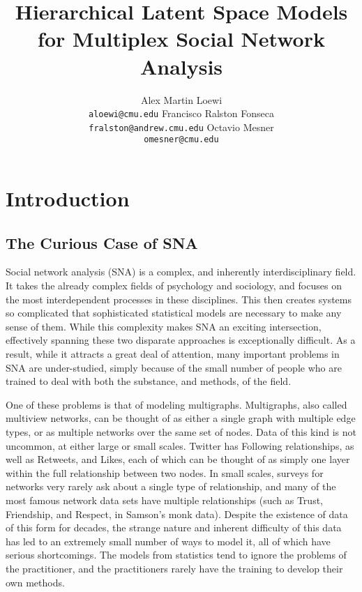 \documentclass{article}
\title{Hierarchical Latent Space Models\\for Multiplex Social Network Analysis}
\author{
  Alex Martin Loewi \\
  \texttt{aloewi@cmu.edu}
  \And
  Francisco Ralston Fonseca\\
  \texttt{fralston@andrew.cmu.edu}
  \And
  Octavio Mesner\\
  \texttt{omesner@cmu.edu}
}
\begin{document}

\maketitle

\begin{abstract}

\end{abstract}

\section{Introduction}


\subsection{The Curious Case of SNA}
Social network analysis (SNA) is a complex, and inherently interdisciplinary field. It takes the already complex fields of psychology and sociology, and focuses on the most interdependent processes in these disciplines. This then creates systems so complicated that sophisticated statistical models are necessary to make any sense of them. While this complexity makes SNA an exciting intersection, effectively spanning these two disparate approaches is exceptionally difficult. As a result, while it attracts a great deal of attention, many important problems in SNA are under-studied, simply because of the small number of people who are trained to deal with both the substance, and methods, of the field.

One of these problems is that of modeling multigraphs. Multigraphs, also called multiview networks, can be thought of as either a single graph with multiple edge types, or as multiple networks over the same set of nodes. Data of this kind is not uncommon, at either large or small scales. Twitter has Following relationships, as well as Retweets, and Likes, each of which can be thought of as simply one layer within the full relationship between two nodes. In small scales, surveys for networks very rarely ask about a single type of relationship, and many of the most famous network data sets have multiple relationships (such as Trust, Friendship, and Respect, in Samson's monk data). Despite the existence of data of this form for decades, the strange nature and inherent difficulty of this data has led to an extremely small number of ways to model it, all of which have serious shortcomings. The models from statistics tend to ignore the problems of the practitioner, and the practitioners rarely have the training to develop their own methods.
\end{document}
